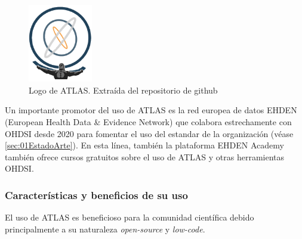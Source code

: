 \begin{figure}[H]
\centering
\includegraphics[width=0.25\textwidth]{figures/ATLASlogo.png}
     \caption{Logo de ATLAS. Extraída del repositorio de github \cite{githubATLAS}}
    \label{fig:ATLASlogo}
\end{figure}

Un importante promotor del uso de ATLAS es la red europea de datos EHDEN (European Health Data \& Evidence Network) \cite{ehden} que colabora estrechamente con OHDSI desde 2020 para fomentar el uso del estandar de la organización (véase \ref{sec:01EstadoArte}). En esta línea, también la plataforma EHDEN Academy también ofrece cursos gratuitos sobre el uso de ATLAS y otras herramientas OHDSI.

\subsubsection{Características y beneficios de su uso}

El uso de ATLAS es beneficioso para la comunidad científica debido principalmente a su naturaleza \textit{open-source} y \textit{low-code}. 


